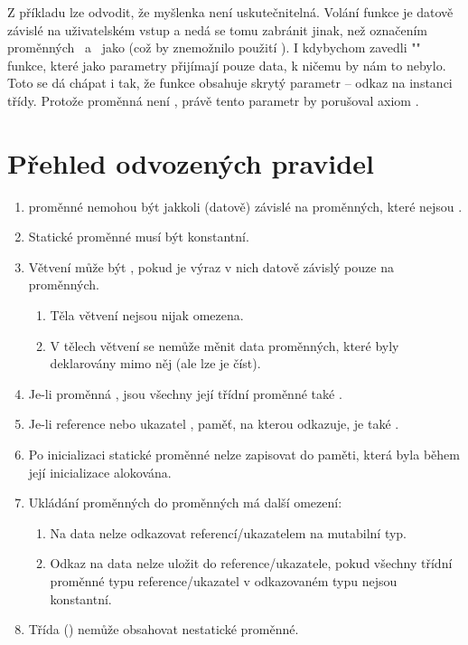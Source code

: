 Z příkladu lze odvodit, že myšlenka není uskutečnitelná. Volání funkce  je datově závislé na uživatelském vstup a nedá se tomu zabránit jinak, než označením proměnných ~a~ jako \ctime (což by znemožnilo použití ). I kdybychom zavedli "\ctime" funkce, které jako parametry přijímají pouze \ctime data, k ničemu by nám to nebylo. Toto se dá chápat i tak, že funkce  obsahuje skrytý parametr -- odkaz na instanci třídy. Protože proměnná  není \ctime, právě tento parametr by porušoval axiom \ctime.

\section{Přehled odvozených pravidel} \label{ctime:rules}
\begin{enumerate}
	\item \ctime proměnné nemohou být jakkoli (datově) závislé na proměnných, které nejsou \ctime. 
	\item Statické \ctime proměnné musí být konstantní.
	\item Větvení může být \ctime, pokud je výraz v nich datově závislý pouze na \ctime proměnných.
	\begin{enumerate}
		\item Těla \ctime větvení nejsou nijak omezena.
		\item V tělech \nonctime větvení se nemůže měnit data \ctime proměnných, které byly deklarovány mimo něj (ale lze je číst).
	\end{enumerate}
	\item Je-li proměnná \ctime, jsou všechny její třídní proměnné také \ctime.
	\item Je-li reference nebo ukazatel \ctime, paměť, na kterou odkazuje, je také \ctime.
	\item Po inicializaci statické \ctime proměnné nelze zapisovat do paměti, která byla během její inicializace alokována.
	\item Ukládání \ctime proměnných do \nonctime proměnných má další omezení:
	\begin{enumerate}
		\item Na \ctime data nelze odkazovat \nonctime referencí/ukazatelem na mutabilní typ.
		\item Odkaz na \ctime data nelze uložit do \nonctime reference/ukazatele, pokud všechny třídní proměnné typu reference/ukazatel v odkazovaném typu nejsou konstantní.
	\end{enumerate}
	\item Třída (\nonctime) nemůže obsahovat nestatické \ctime proměnné.
\end{enumerate}


